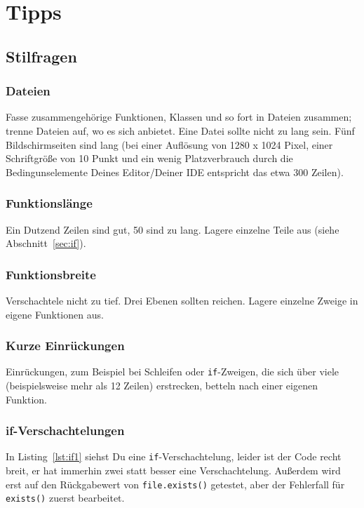 \documentclass[twoside]{scrartcl}
\providecommand{\code}[1]{\texttt{#1}}
\begin{document}
\section{Tipps\label{sec:tipps}}
\subsection{Stilfragen}
\subsubsection{Dateien}
Fasse zusammengeh\"o{}rige Funktionen, Klassen und so fort in Dateien zusammen; 
trenne Dateien auf, wo es sich anbietet.
Eine Datei sollte nicht zu lang sein. F\"u{}nf Bildschirmseiten sind
lang (bei einer Aufl\"o{}sung von 1280 x 1024 Pixel, einer
Schriftgr\"o{}\ss{}e von 10 Punkt und ein wenig Platzverbrauch durch die
Bedingunselemente Deines Editor/Deiner IDE entspricht das etwa 300
Zeilen).

\subsubsection{Funktionsl\"a{}nge} 
Ein Dutzend Zeilen sind gut, 50 sind zu lang.
Lagere einzelne Teile aus (siehe Abschnitt~\ref{sec:if}).

\subsubsection{Funktionsbreite\label{sec:breite}} 
Verschachtele nicht zu tief. Drei Ebenen sollten reichen. 
Lagere einzelne Zweige in eigene Funktionen aus.

\subsubsection{Kurze Einr\"u{}ckungen} 
Einr\"u{}ckungen, zum Beispiel bei Schleifen oder \code{if}-Zweigen,
die sich \"u{}ber viele (beispielsweise mehr als 12 Zeilen) erstrecken, betteln
nach einer eigenen Funktion.

\subsubsection{if-Verschachtelungen\label{sec:if}}
In Listing~\ref{lst:if1} siehst Du eine \code{if}-Verschachtelung, leider ist
der Code recht breit, er hat immerhin zwei statt besser eine Verschachtelung.
Au\ss{}erdem wird erst auf den R\"u{}ckgabewert von
\code{file.exists()} getestet, aber der Fehlerfall f\"u{}r
\code{exists()} zuerst bearbeitet.
\end{document}
